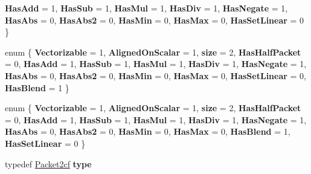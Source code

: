 \begin{DoxyCompactItemize}
{\bfseries Has\+Add} = 1, 
{\bfseries Has\+Sub} = 1, 
{\bfseries Has\+Mul} = 1, 
{\bfseries Has\+Div} = 1, 
\newline
{\bfseries Has\+Negate} = 1, 
{\bfseries Has\+Abs} = 0, 
{\bfseries Has\+Abs2} = 0, 
{\bfseries Has\+Min} = 0, 
\newline
{\bfseries Has\+Max} = 0, 
{\bfseries Has\+Set\+Linear} = 0
 \}
\item 
\mbox{\label{struct_eigen_1_1internal_1_1packet__traits_3_01std_1_1complex_3_01float_01_4_01_4_a4c62c8e48a9e36b32b44bae647016915}} 
enum \{ \newline
{\bfseries Vectorizable} = 1, 
{\bfseries Aligned\+On\+Scalar} = 1, 
{\bfseries size} = 2, 
{\bfseries Has\+Half\+Packet} = 0, 
\newline
{\bfseries Has\+Add} = 1, 
{\bfseries Has\+Sub} = 1, 
{\bfseries Has\+Mul} = 1, 
{\bfseries Has\+Div} = 1, 
\newline
{\bfseries Has\+Negate} = 1, 
{\bfseries Has\+Abs} = 0, 
{\bfseries Has\+Abs2} = 0, 
{\bfseries Has\+Min} = 0, 
\newline
{\bfseries Has\+Max} = 0, 
{\bfseries Has\+Set\+Linear} = 0, 
{\bfseries Has\+Blend} = 1
 \}
\item 
\mbox{\label{struct_eigen_1_1internal_1_1packet__traits_3_01std_1_1complex_3_01float_01_4_01_4_ab00494efca2b1a8e71f2cac7b49eddbe}} 
enum \{ \newline
{\bfseries Vectorizable} = 1, 
{\bfseries Aligned\+On\+Scalar} = 1, 
{\bfseries size} = 2, 
{\bfseries Has\+Half\+Packet} = 0, 
\newline
{\bfseries Has\+Add} = 1, 
{\bfseries Has\+Sub} = 1, 
{\bfseries Has\+Mul} = 1, 
{\bfseries Has\+Div} = 1, 
\newline
{\bfseries Has\+Negate} = 1, 
{\bfseries Has\+Abs} = 0, 
{\bfseries Has\+Abs2} = 0, 
{\bfseries Has\+Min} = 0, 
\newline
{\bfseries Has\+Max} = 0, 
{\bfseries Has\+Blend} = 1, 
{\bfseries Has\+Set\+Linear} = 0
 \}
\item 
\mbox{\label{struct_eigen_1_1internal_1_1packet__traits_3_01std_1_1complex_3_01float_01_4_01_4_a580a3908d84d95ba19d0c9bddcb40f6a}} 
typedef \mbox{\hyperlink{struct_eigen_1_1internal_1_1_packet2cf}{Packet2cf}} {\bfseries type}

\end{DoxyCompactItemize}
